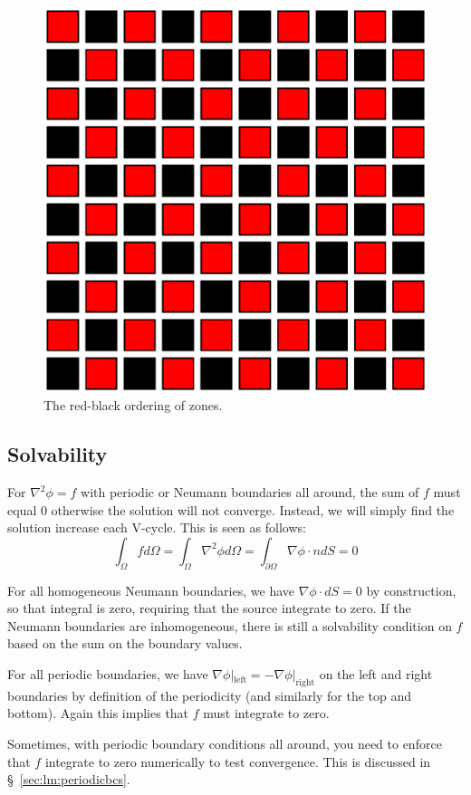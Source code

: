 \begin{figure}[t]
  \centering
  \includegraphics[width=0.6\linewidth]{rb}
  \caption[Red-black ordering of zones]
{\label{fig:rb} The red-black ordering of zones.}
\end{figure}


\subsection{Solvability}

For $\nabla^2 \phi = f$ with periodic or
Neumann boundaries all around, the sum of $f$ must equal $0$
otherwise the solution will not converge.  Instead, we will simply
find the solution increase each V-cycle.  This is seen as follows:
\begin{equation}
  \int_\Omega f d\Omega = \int_\Omega \nabla^2 \phi d\Omega =
  \int_{\partial \Omega} \nabla \phi \cdot n dS = 0
\end{equation}

For all homogeneous Neumann boundaries, we have $\nabla \phi \cdot dS
= 0$ by construction, so that integral is zero, requiring that the
source integrate to zero.  If the Neumann boundaries are inhomogeneous,
there is still a solvability condition on $f$ based on the sum on
the boundary values.

For all periodic boundaries, we have $\nabla \phi
|_\mathrm{left} = -\nabla \phi |_\mathrm{right}$ on the left and right
boundaries by definition of the periodicity (and similarly for the top
and bottom).  Again this implies that $f$ must integrate to zero.

Sometimes, with periodic boundary conditions all around, you need to
enforce that $f$ integrate to zero numerically to test convergence.
This is discussed in \S~\ref{sec:lm:periodicbcs}.

